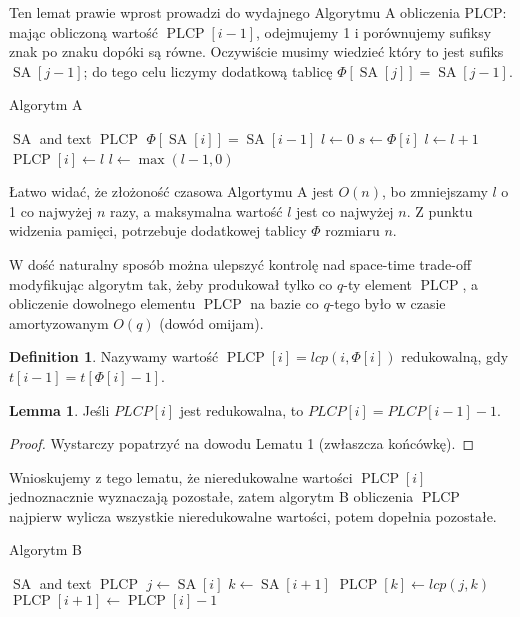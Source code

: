 \documentclass[a4paper,12pt]{article}
\theoremstyle{definition}
\newtheorem{definition}{Definition}[section]
\newtheorem{lemma}{Lemma}[section]
\DeclareMathOperator{\SA}{SA}
\DeclareMathOperator{\PLCP}{PLCP}
\begin{document}
Ten lemat prawie wprost prowadzi do wydajnego Algorytmu A obliczenia PLCP: mając obliczoną wartość $\PLCP[i - 1]$, odejmujemy 1 i porównujemy sufiksy znak po znaku dopóki są równe. Oczywiście musimy wiedzieć który to jest sufiks $\SA[j - 1]$; do tego celu liczymy dodatkową tablicę $\Phi[\SA[j]] = \SA[j - 1]$.

\begin{algorithm}[H]
\caption{Algorytm A}
\begin{algorithmic} 
\REQUIRE $\SA$ and text
\ENSURE $\PLCP$
\STATE $\Phi[\SA[i]] = \SA[i - 1]$
\ENDFOR
\STATE $l \gets 0$
\STATE $s \gets \Phi[i]$
\STATE $l \gets l + 1$
\ENDWHILE
\STATE $\PLCP[i] \gets l$
\STATE $l \gets \max(l - 1, 0)$
\ENDFOR
\end{algorithmic}
\end{algorithm}

Łatwo widać, że złożoność czasowa Algortymu A jest $O(n)$, bo zmniejszamy $l$ o 1 co najwyżej $n$ razy, a maksymalna wartość $l$ jest co najwyżej $n$. Z punktu widzenia pamięci, potrzebuje dodatkowej tablicy $\Phi$ rozmiaru $n$.
\par
W dość naturalny sposób można ulepszyć kontrolę nad space-time trade-off modyfikując algorytm tak, żeby produkował tylko co $q$-ty element $\PLCP$, a obliczenie dowolnego elementu $\PLCP$ na bazie co $q$-tego było w czasie amortyzowanym $O(q)$ (dowód omijam).

\begin{definition}
Nazywamy wartość $\PLCP[i] = lcp(i, \Phi[i])$ redukowalną, gdy $t[i - 1] = t[\Phi[i] - 1]$.
\end{definition}

\begin{lemma}
Jeśli $PLCP[i]$ jest redukowalna, to $PLCP[i] = PLCP[i - 1] - 1$.
\begin{proof}
Wystarczy popatrzyć na dowodu Lematu 1 (zwłaszcza końcówkę).
\end{proof}
\end{lemma}

Wnioskujemy z tego lematu, że nieredukowalne wartości $\PLCP[i]$ jednoznacznie wyznaczają pozostałe, zatem algorytm B obliczenia $\PLCP$ najpierw wylicza wszystkie nieredukowalne wartości, potem dopełnia pozostałe.

\begin{algorithm}[H]
\caption{Algorytm B}
\begin{algorithmic} 
\REQUIRE $\SA$ and text
\ENSURE $\PLCP$
\STATE $j \gets \SA[i]$
\STATE $k \gets \SA[i + 1]$
\STATE $\PLCP[k] \gets lcp(j, k)$
\ENDIF
\ENDFOR
{}
\IF{$\PLCP[i + 1] < \PLCP[i] - 1$}
\STATE $\PLCP[i + 1] \gets \PLCP[i] - 1$
\ENDIF
\ENDFOR
\end{algorithmic}
\end{algorithm}
\end{document}
